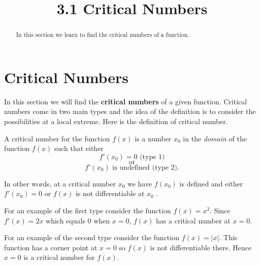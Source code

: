\documentclass{ximera}
\title{3.1 Critical Numbers}
\begin{document}
\begin{abstract}
In this section we learn to find the critical numbers of a function.
\end{abstract}

\maketitle









\section{Critical Numbers}

In this section we will find the {\bf critical numbers} of a given function. Critical numbers come in two main types and the idea of the definition is to consider the possibilities at a local extreme. Here is the definition of  critical number.  \\



\begin{definition}
A critical number for the function $f(x)$ is a number 
$x_0$ in the {\it domain} of the function $f(x)$ such that either
\[f'(x_0) = 0 \text{  (type 1)}\]
\[ \text{or} \]
\[f'(x_0)  \text{   is undefined  (type 2)}.\]
\end{definition}
In other words, at a critical number $x_0$ we have  $f(x_0)$ is defined and either $f'(x_0) = 0$ or
$f(x)$ is not differentiable at $x_0$ .

For an example of the first type  consider the function $f(x) = x^2$.   
Since $f'(x) = 2x$ which equals 0 when $x = 0$,
$f(x)$ has a critical number at $x = 0$.

For an example of the second type consider the function $f(x) = |x|$. This function has a corner point at $x = 0$
so $f(x)$ is not differentiable there. Hence $x=0$ is a critical number for $f(x)$.
\end{document}
